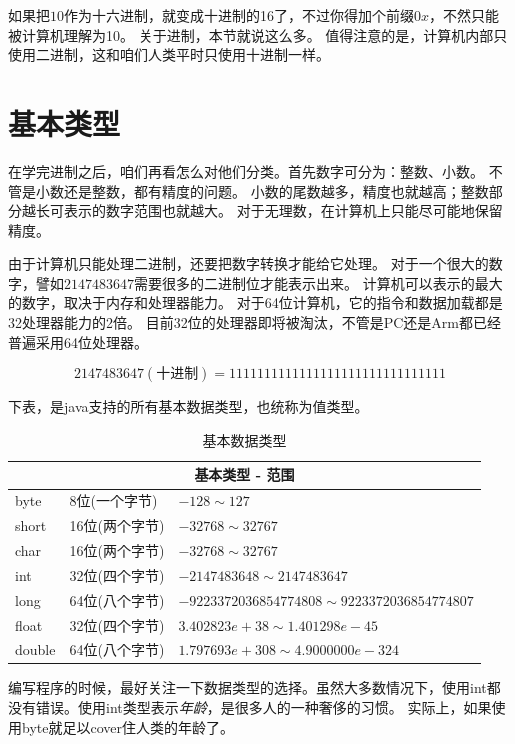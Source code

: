 如果把$10$作为十六进制，就变成十进制的16了，不过你得加个前缀$0x$，不然只能被计算机理解为10。
关于进制，本节就说这么多。
值得注意的是，计算机内部只使用二进制，这和咱们人类平时只使用十进制一样。

\section{基本类型}
在学完进制之后，咱们再看怎么对他们分类。首先数字可分为：整数、小数。
不管是小数还是整数，都有精度的问题。
小数的尾数越多，精度也就越高；整数部分越长可表示的数字范围也就越大。
对于无理数，在计算机上只能尽可能地保留精度。

由于计算机只能处理二进制，还要把数字转换才能给它处理。
对于一个很大的数字，譬如$2147483647$需要很多的二进制位才能表示出来。
计算机可以表示的最大的数字，取决于内存和处理器能力。
对于64位计算机，它的指令和数据加载都是32处理器能力的2倍。
目前32位的处理器即将被淘汰，不管是PC还是Arm都已经普遍采用64位处理器。

\begin{equation}
    2147483647(\text{十进制}) = 1111111111111111111111111111111
\end{equation}


\noindent
下表，是java支持的所有基本数据类型，也统称为值类型。
\begin{table}[!htbp]\centering
\small
\begin{tabular}{|p{1cm}|p{3cm}|p{9cm}|}
\hline
\multicolumn{3}{|c|}{基本类型 - 范围}\\
\hline
byte&8位(一个字节)&$-128\sim127$\\
short&16位(两个字节)&$-32768\sim32767$\\
char&16位(两个字节)&$-32768\sim32767$\\
int&32位(四个字节)&$-2147483648\sim2147483647$\\
long&64位(八个字节)&$-9223372036854774808\sim9223372036854774807$\\
float&32位(四个字节)&$3.402823e+38\sim1.401298e-45$\\
double&64位(八个字节)&$1.797693e+308\sim4.9000000e-324$\\
\hline
\end{tabular}
\caption{基本数据类型}
\label{table:part1_data_types}
\end{table}

编写程序的时候，最好关注一下数据类型的选择。虽然大多数情况下，使用int都没有错误。使用int类型表示\emph{年龄}，是很多人的一种奢侈的习惯。
实际上，如果使用byte就足以cover住人类的年龄了。

